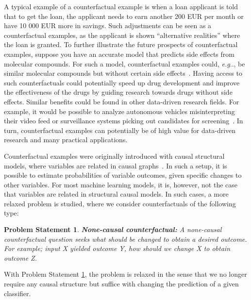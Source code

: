 \documentclass[11pt,a4paper,twoside,openright,final]{memoir}
\makeatletter
\newtheorem{problem}{Problem Statement}
\DeclareRobustCommand\onedot{\futurelet\@let@token\@onedot}
\def\@onedot{\ifx\@let@token.\else.\null\fi\xspace}
\def\eg{\emph{e.g}\onedot} \def\Eg{\emph{E.g}\onedot}
\makeatother
\begin{document}
A typical example of a counterfactual example is when a loan applicant is told that to get the loan, the applicant needs to earn another 200 EUR per month or have 10 000 EUR more in savings.
Such adjustments can be seen as a counterfactual examples, as the applicant is shown ``alternative realities'' where the loan is granted.
To further illustrate the future prospects of counterfactual examples, suppose you have an accurate model that predicts side effects from molecular compounds.
For such a model, counterfactual examples could, \eg, be similar molecular compounds but without certain side effects~\cite{carter2017using, moses}.
Having access to such counterfactuals could potentially speed up drug development and improve the effectiveness of the drugs by guiding research towards drugs without side effects.
Similar benefits could be found in other data-driven research fields.
For example, it would be possible to analyze autonomous vehicles misinterpreting their video feed or surveillance systems picking out candidates for screening~\cite{goyal19a}. 
In turn, counterfactual examples can potentially be of high value for data-driven research and many practical applications. 

Counterfactual examples were originally introduced with causal structural models, where variables are related in causal graphs~\cite{pearl2015a}.
In such a setup, it is possible to estimate probabilities of variable outcomes, given specific changes to other variables.
For most machine learning models, it is, however, not the case that variables are related in structural causal models.
In such cases, a more relaxed problem is studied, where we consider counterfactuals of the following type: 
\begin{problem}\label{def:dl-counterfactual}
    \textbf{None-causal counterfactual:} A none-causal counterfactual question seeks what should be changed to obtain a desired outcome. For example; input X yielded outcome Y, how should we change X to obtain outcome Z. 
\end{problem}
With Problem Statement \ref{def:dl-counterfactual}, the problem is relaxed in the sense that we no longer require any causal structure but suffice with changing the prediction of a given classifier. 
\end{document}
